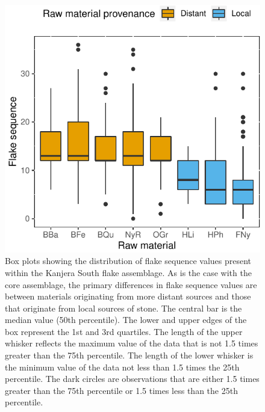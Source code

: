 \documentclass[]{elsarticle} %
\begin{document}
\begin{figure}
\centering
\includegraphics{Kanjera_South_Manuscript_files/figure-latex/fig-4-1.pdf}
\caption{Box plots showing the distribution of flake sequence values
present within the Kanjera South flake assemblage. As is the case with
the core assemblage, the primary differences in flake sequence values
are between materials originating from more distant sources and those
that originate from local sources of stone. The central bar is the
median value (50th percentile). The lower and upper edges of the box
represent the 1st and 3rd quartiles. The length of the upper whisker
reflects the maximum value of the data that is not 1.5 times greater
than the 75th percentile. The length of the lower whisker is the minimum
value of the data not less than 1.5 times the 25th percentile. The dark
circles are observations that are either 1.5 times greater than the 75th
percentile or 1.5 times less than the 25th percentile.
\label{flake_seq_rm}}
\end{figure}
\end{document}
